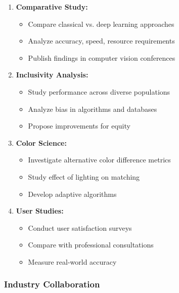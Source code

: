 \begin{enumerate}
    \item \textbf{Comparative Study:}
    \begin{itemize}
        \item Compare classical vs. deep learning approaches
        \item Analyze accuracy, speed, resource requirements
        \item Publish findings in computer vision conferences
    \end{itemize}
    
    \item \textbf{Inclusivity Analysis:}
    \begin{itemize}
        \item Study performance across diverse populations
        \item Analyze bias in algorithms and databases
        \item Propose improvements for equity
    \end{itemize}
    
    \item \textbf{Color Science:}
    \begin{itemize}
        \item Investigate alternative color difference metrics
        \item Study effect of lighting on matching
        \item Develop adaptive algorithms
    \end{itemize}
    
    \item \textbf{User Studies:}
    \begin{itemize}
        \item Conduct user satisfaction surveys
        \item Compare with professional consultations
        \item Measure real-world accuracy
    \end{itemize}
\end{enumerate}

\subsubsection{Industry Collaboration}

